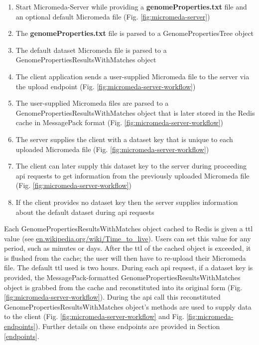 \begin{enumerate}
  \item Start Micromeda-Server while providing a \textbf{genomeProperties.txt} file and an optional default Micromeda file (Fig. \ref{fig:micromeda-server})
  \item The \textbf{genomeProperties.txt} file is parsed to a GenomePropertiesTree object
  \item The default dataset Micromeda file is parsed to a GenomePropertiesResultsWithMatches object  
  \item The client application sends a user-supplied Micromeda file to the server via the upload endpoint (Fig. \ref{fig:micromeda-server-workflow})
  \item The user-supplied Micromeda files are parsed to a GenomePropertiesResultsWithMatches object that is later stored in the Redis cache in MessagePack format (Fig. \ref{fig:micromeda-server-workflow})
  \item The server supplies the client with a dataset key that is unique to each uploaded Micromeda file (Fig. \ref{fig:micromeda-server-workflow})
  \item The client can later supply this dataset key to the server during proceeding \gls{api} requests to get information from the previously uploaded Micromeda file (Fig. \ref{fig:micromeda-server-workflow})
  \item If the client provides no dataset key then the server supplies information about the default dataset during \gls{api} requests
\end{enumerate}

Each GenomePropertiesResultsWithMatches object cached to Redis is given a \gls{ttl} value \cite{gwertzman1996world} (see \href{http://en.wikipedia.org/wiki/Time_to_live}{en.wikipedia.org/wiki/Time\_to\_live}). Users can set this value for any period, such as minutes or days. After the \gls{ttl} of the cached object is exceeded, it is flushed from the cache; the user will then have to re-upload their Micromeda file. The default \gls{ttl} used is two hours. During each \gls{api} request, if a dataset key is provided, the MessagePack-formatted GenomePropertiesResultsWithMatches object is grabbed from the cache and reconstituted into its original form (Fig. \ref{fig:micromeda-server-workflow}). During the \gls{api} call this reconstituted GenomePropertiesResultsWithMatches object's methods are used to supply data to the client  (Fig. \ref{fig:micromeda-server-workflow} and Fig. \ref{fig:micromeda-endpoints}). Further details on these endpoints are provided in Section \ref{endpoints}.


